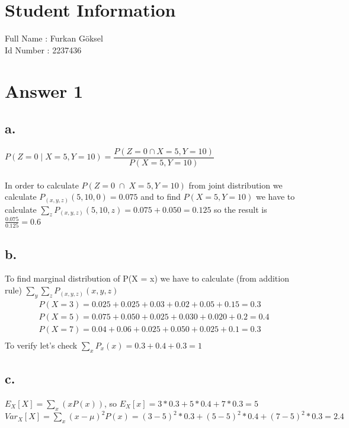\documentclass[12pt]{article}
\begin{document}
\section*{Student Information } 
Full Name : Furkan Göksel \\
Id Number : 2237436 \\

\section*{Answer 1}

\subsection*{a.}
$P(Z=0 \; | \; X=5, Y=10 ) = \dfrac{P(Z=0 \cap X =5,Y=10)}{P(X=5,Y=10)}$ \\ \\
In order to calculate $P(Z=0 \; \cap \; X =5,Y=10)$ from joint distribution we calculate $P_{(x,y,z)}(5,10,0) = 0.075$ and to find $P(X=5,Y=10)$ we have to calculate $\sum_{z}P_{(x,y,z)}(5,10,z) = 0.075+0.050 = 0.125$ so the result is $\frac{0.075}{0.125} = 0.6$
\subsection*{b.}
To find marginal distribution of P(X = x) we have to calculate (from addition rule) $\sum_{y}\sum_{z}P_{(x,y,z)}(x,y,z)$
\begin{equation} 
\begin{split}
P(X=3) = 0.025+0.025+0.03+0.02+0.05+0.15 = 0.3 \\
P(X=5) = 0.075+0.050+0.025+0.030+0.020+0.2 = 0.4 \\
P(X=7) = 0.04+0.06+0.025+0.050+0.025+0.1 = 0.3 \\
\end{split}
\end{equation}
To verify let's check $\sum_xP_x(x) = 0.3+0.4+0.3=1$
\subsection*{c.}
$E_X[X]= \sum_x(xP(x))$, so $E_X[x] = 3*0.3+5*0.4+7*0.3 = 5$ \\
$Var_X[X] = \sum_x(x-\mu)^2P(x) = (3-5)^2*0.3+(5-5)^2*0.4+(7-5)^2*0.3 =2.4$
\end{document}
